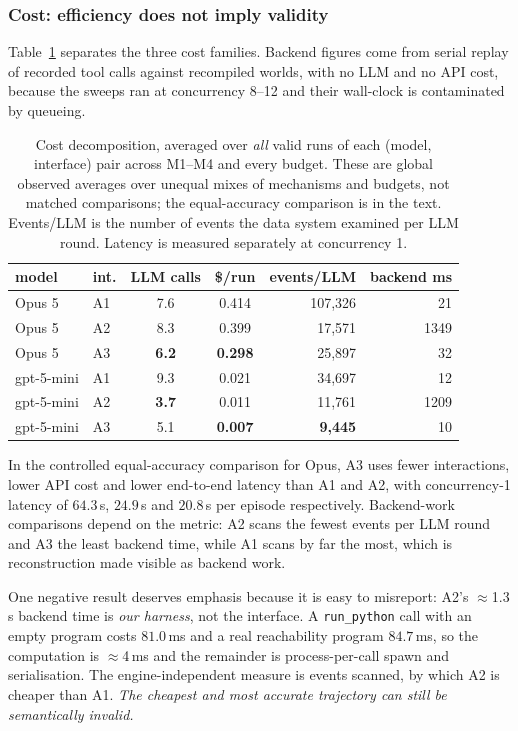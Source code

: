 \documentclass[sigconf,anonymous,review]{acmart}
\begin{document}
\subsubsection{Cost: efficiency does not imply validity}
Table~\ref{tab:cost} separates the three cost families. Backend figures come from serial replay of
recorded tool calls against recompiled worlds, with no LLM and no API cost, because the sweeps ran
at concurrency 8--12 and their wall-clock is contaminated by queueing.

\begin{table}[t]
\caption{Cost decomposition, averaged over \emph{all} valid runs of each (model, interface) pair
across M1--M4 and every budget. These are global observed averages over unequal mixes of mechanisms
and budgets, not matched comparisons; the equal-accuracy comparison is in the text. Events/LLM is
the number of events the data system examined per LLM round. Latency is measured separately at
concurrency 1.}
\label{tab:cost}
\small
\begin{tabular}{@{}llccrr@{}}
\toprule
model & int. & LLM calls & \$/run & events/LLM & backend ms \\
\midrule
Opus 5 & A1 & 7.6 & 0.414 & 107{,}326 & 21 \\
Opus 5 & A2 & 8.3 & 0.399 & 17{,}571 & 1349 \\
Opus 5 & A3 & \textbf{6.2} & \textbf{0.298} & 25{,}897 & 32 \\
\addlinespace
gpt-5-mini & A1 & 9.3 & 0.021 & 34{,}697 & 12 \\
gpt-5-mini & A2 & \textbf{3.7} & 0.011 & 11{,}761 & 1209 \\
gpt-5-mini & A3 & 5.1 & \textbf{0.007} & \textbf{9{,}445} & 10 \\
\bottomrule
\end{tabular}
\end{table}

In the controlled equal-accuracy comparison for Opus, A3 uses fewer interactions, lower API cost
and lower end-to-end latency than A1 and A2, with concurrency-1 latency of $64.3$\,s, $24.9$\,s and
$20.8$\,s per episode respectively. Backend-work comparisons depend on the metric: A2 scans the
fewest events per LLM round and A3 the least backend time, while A1 scans by far the most, which is
reconstruction made visible as backend work.

One negative result deserves emphasis because it is easy to misreport: A2's $\approx$1.3\,s backend
time is \emph{our harness}, not the interface. A \texttt{run\_python} call with an empty program
costs $81.0$\,ms and a real reachability program $84.7$\,ms, so the computation is $\approx$4\,ms
and the remainder is process-per-call spawn and serialisation. The engine-independent measure is
events scanned, by which A2 is cheaper than A1. \emph{The cheapest and most accurate trajectory can
still be semantically invalid.}
\end{document}
